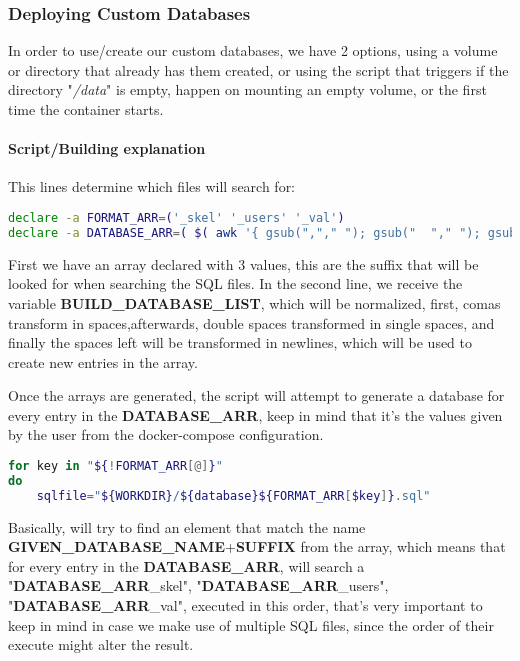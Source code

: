 \subsubsection[Deploying Custom Databases]{Deploying Custom Databases}
\begin{flushleft}
    In order to use/create our custom databases, we have 2 options, using a volume or directory that already has them
    created, or using the script that triggers if the directory "\textit{/data}" is empty, happen on mounting an empty
    volume, or the first time the container starts.
\end{flushleft}
\paragraph{Script/Building explanation}
\begin{flushleft}
    This lines determine which files will search for:
    \begin{lstlisting}[language=bash,label={lst:declare_array}]
declare -a FORMAT_ARR=('_skel' '_users' '_val')
declare -a DATABASE_ARR=( $( awk '{ gsub(","," "); gsub("  "," "); gsub(" ","\n"); print}' <<< "$BUILD_DATABASE_LIST" ) );
    \end{lstlisting}
    First we have an array declared with 3 values, this are the suffix that will be looked for when searching the SQL files.
    In the second line, we receive the variable \textbf{BUILD\_DATABASE\_LIST}, which will be normalized, first, comas transform
    in spaces,afterwards, double spaces transformed in single spaces, and finally the spaces left will be transformed in newlines,
    which will be used to create new entries in the array.

    \begin{flushleft}
        Once the arrays are generated, the script will attempt to generate a database for every entry in the
        \textbf{DATABASE\_ARR}, keep in mind that it's the values given by the user from the docker-compose configuration.
    \end{flushleft}

    \begin{lstlisting}[language=bash,label={lst:for_array}]
for key in "${!FORMAT_ARR[@]}"
do
    sqlfile="${WORKDIR}/${database}${FORMAT_ARR[$key]}.sql"
    \end{lstlisting}
    Basically, will try to find an element that match the name \textbf{GIVEN\_DATABASE\_NAME}+\textbf{SUFFIX} from the array,
    which means that for every entry in the \textbf{DATABASE\_ARR}, will search a "\textbf{DATABASE\_ARR}\_skel",
    "\textbf{DATABASE\_ARR}\_users", "\textbf{DATABASE\_ARR}\_val", executed in this order, that's very important to
    keep in mind in case we make use of multiple SQL files, since the order of their execute might alter the result.
\end{flushleft}

